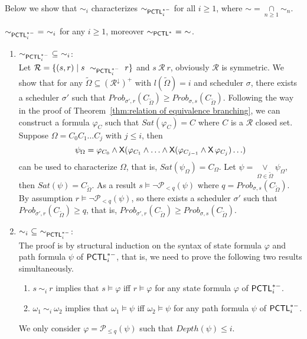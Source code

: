 \documentclass{LMCS}
\def\phi{\varphi}
\DeclareMathOperator{\X}{\text{\sf X}}
\def\tilde{\widetilde}
\newcommand{\PCTL}{{\sf PCTL}}
\newcommand{\iBS}[1]{\sim_{#1}}
\newcommand{\infBS}{\sim}
\newcommand{\EPCTLS}{\sim_{\PCTL^{*}}}
\newcommand{\iEPCTLSM}[1]{\sim_{\PCTL_{#1}^{*-}}}
\newcommand{\MC}[1]{\mathcal{#1}}
\newcommand{\DEPTH}{\mathit{Depth}}
\newcommand{\MEASURE}{\mathit{Prob}}
\newcommand{\DOWNWARD}[2]{#1^{\downarrow}#2}
\begin{document}
Below we show that $\iBS{i}$ characterizes $\iEPCTLSM{i}$ for all $i\ge 1$, where $\infBS=\mathop{\cap}\limits_{n\geq 1}\iBS{n}$.
\begin{thm}\label{thm:relation of equivalence}
$\iEPCTLSM{i}~=~\iBS{i}$ for any $i\geq1$, moreover $\EPCTLS~=~\iBS{}$.
\end{thm}

\proof\hfill
\begin{enumerate}[(1)]
\item $\iEPCTLSM{i}~\subseteq~\iBS{i}$:\\
Let $\MC{R}=\{(s,r)\mid s~\iEPCTLSM{i}~r\}$ and $s~\MC{R}~r$, obviously $\MC{R}$ is symmetric. We show that for any $\tilde{\Omega}\subseteq (\DOWNWARD{\MC{R}}{})^+$ with $l(\tilde{\Omega})=i$ and scheduler $\sigma$, there exists a scheduler $\sigma'$ such that $\MEASURE_{\sigma',r}(C_{\tilde{\Omega}})\ge\MEASURE_{\sigma,s}(C_{\tilde{\Omega}})$.
Following the way in the proof of Theorem~\ref{thm:relation of equivalence branching}, we can construct a formula $\phi_C$ such that $\mathit{Sat}(\phi_C)=C$ where $C$ is a $\MC{R}$ closed set. Suppose $\Omega=C_0C_1\ldots C_j$ with $j\leq i$, then
\[\psi_{\Omega}=\phi_{C_0}\land\X(\phi_{C_1}\land\ldots\land\X(\phi_{C_{j-1}}\land\X\phi_{C_j})\ldots)\]
can be used to characterize $\Omega$, that is, $\mathit{Sat}(\psi_{\Omega})=C_{\Omega}$. Let $\psi=\mathop{\lor}\limits_{\Omega\in\tilde{\Omega}}\psi_{\Omega}$, then $\mathit{Sat}(\psi)=C_{\tilde{\Omega}}$. As a result $s\models\neg \MC{P}_{<q}(\psi)$ where $q=\MEASURE_{\sigma,s}(C_{\tilde{\Omega}})$. By assumption $r\models\neg \MC{P}_{<q}(\psi)$, so there exists a scheduler $\sigma'$ such that $\MEASURE_{\sigma',r}(C_{\tilde{\Omega}})\geq q$, that is, $\MEASURE_{\sigma',r}(C_{\tilde{\Omega}})\geq\MEASURE_{\sigma,s}(C_{\tilde{\Omega}})$.
\item $\iBS{i}~\subseteq~\iEPCTLSM{i}$:\\
The proof is by structural induction on the syntax of state formula $\phi$ and path formula $\psi$ of $\PCTL^{*-}_i$, that is, we need to prove the following two results simultaneously.
\begin{enumerate}
\item $s~\iBS{i}~r$ implies that $s\models\phi$ iff $r\models\phi$ for any state formula $\phi$ of $\PCTL^{*-}_i$.
\item $\omega_1~\iBS{i}~\omega_2$ implies that $\omega_1\models\psi$ iff $\omega_2\models\psi$ for any path formula $\psi$ of $\PCTL^{*-}_i$.
\end{enumerate}
We only consider $\phi=\MC{P}_{\leq q}(\psi)$ such that $\DEPTH(\psi)\leq i$. 

\end{enumerate}
\end{document}
